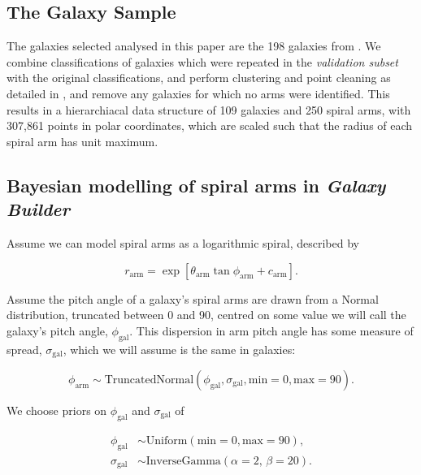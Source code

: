 \subsection{The Galaxy Sample}
The galaxies selected analysed in this paper are the 198 galaxies from . We combine classifications of galaxies which were repeated in the \textit{validation subset} with the original classifications, and perform clustering and point cleaning as detailed in , and remove any galaxies for which no arms were identified. This results in a hierarchiacal data structure of 109 galaxies and 250 spiral arms, with 307,861 points in polar coordinates, which are scaled such that the radius of each spiral arm has unit maximum.


\subsection{Bayesian modelling of spiral arms in \textit{Galaxy Builder}}

Assume we can model spiral arms as a logarithmic spiral, described by

\begin{equation}
r_\mathrm{arm} = \exp\left[\theta_\mathrm{arm}\tan\phi_\mathrm{arm} + c_\mathrm{arm}\right].
\end{equation}

Assume the pitch angle of a galaxy's spiral arms are drawn from a Normal distribution, truncated between 0 and 90, centred on some value we will call the galaxy's pitch angle, $\phi_\mathrm{gal}$. This dispersion in arm pitch angle has some measure of spread, $\sigma_\mathrm{gal}$, which we will assume is the same in galaxies:

\begin{equation}
\phi_\mathrm{arm} \sim \mathrm{TruncatedNormal}(\phi_\mathrm{gal}, \sigma_\mathrm{gal}, \mathrm{min}=0, \mathrm{max}=90).
\end{equation}

We choose priors on $\phi_\mathrm{gal}$ and $\sigma_\mathrm{gal}$ of

\begin{align}
  \phi_\mathrm{gal} &\sim \mathrm{Uniform}(\mathrm{min}=0, \mathrm{max}=90),\\
  \sigma_\mathrm{gal} &\sim \mathrm{InverseGamma}(\alpha=2,\,\beta=20).
\end{align}

